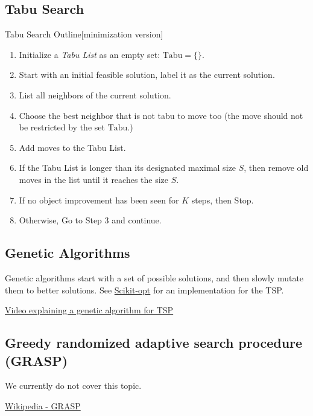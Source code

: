 

\subsection{Tabu Search}
\begin{general}{Tabu Search Outline}{[minimization version]}
\begin{enumerate}
\item Initialize a \emph{Tabu List} as an empty set: $\textrm{Tabu} = \{ \}$.
\item Start with an initial feasible solution, label it as the current solution.
\item List all neighbors of the current solution.
\item Choose the best neighbor that is not tabu to move too (the move should not be restricted by the set $\textrm{Tabu}$.)
\item Add moves to the Tabu List.
\item If the Tabu List is longer than its designated maximal size $S$, then remove old moves in the list until it reaches the size $S$.
\item If no object improvement has been seen for $K$ steps, then Stop.
\item Otherwise, Go to Step 3 and continue.
\end{enumerate}
\end{general}


\subsection{Genetic Algorithms}
Genetic algorithms start with a set of possible solutions, and then slowly mutate them to better solutions.  See \href{https://github.com/guofei9987/scikit-opt}{Scikit-opt} for an implementation for the TSP.


\href{https://www.youtube.com/watch?v=XP8R0yzAbdo&ab_channel=FullstackAcademy}{Video explaining a genetic algorithm for TSP}

\subsection{Greedy randomized adaptive search procedure (GRASP)}
We currently do not cover this topic.  

\href{https://en.wikipedia.org/wiki/Greedy_randomized_adaptive_search_procedure}{Wikipedia - GRASP}

